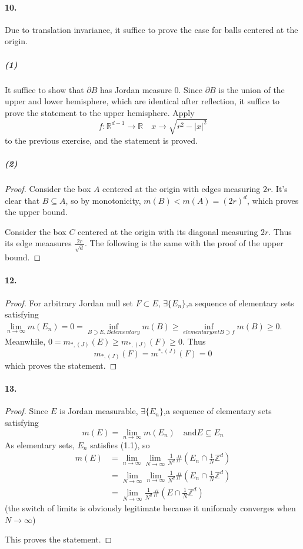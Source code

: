 \documentclass{article}
\begin{document}
\paragraph{10.}
Due to translation invariance, it suffice to prove the case for balls centered at the origin.
\subparagraph{(1)}
It suffice to show that $\partial B$ has Jordan measure 0. Since $\partial B$ is the union of the upper and lower hemisphere, which are identical after reflection, it suffice to prove the statement to the upper hemisphere. Apply \[f:\mathbb{R}^{d-1}\to \mathbb{R}\quad x\to \sqrt{r^2-|x|^2}\]
to the previous exercise, and the statement is proved.
\subparagraph{(2)}
\begin{proof}
Consider the box $A$ centered at the origin with edges measuring $2r$. It's clear that $B\subseteq A$, so by monotonicity, $m(B)<m(A)=(2r)^d$, which proves the upper bound.

Consider the box $C$ centered at the origin with its diagonal measuring $2r$. Thus its edge meaasures $\frac{2r}{\sqrt{d}}$. The following is the same with the proof of the upper bound.
\end{proof}

\paragraph{12.}
\begin{proof}
For arbitrary Jordan null set $F \subset E$, $\exists \{E_n\}$,a sequence of elementary sets satisfying $\lim\limits_{n\to \infty}m(E_n)=0=\inf\limits_{B\supset E, B elementary} m(B)\geq\inf\limits_{elementary set B\supset f} m(B)\geq 0$. Meanwhile, $0=m_{*,(J)}(E) \geq m_{*,(J)}(F)\geq 0$. Thus
\[ m_{*,(J)}(F)=m^{*,(J)}(F)=0\]
which proves the statement.
\end{proof}


\paragraph{13.}
\begin{proof}
Since $E$ is Jordan measurable, $\exists \{E_n\}$,a sequence of elementary sets satisfying
\[m(E)=\lim_{n\to\infty}m(E_n) \quad \text{and} E\subseteq E_n\]
As elementary sets, $E_n$ satisfies (1.1), so
\begin{align*}
m(E)&=\lim_{n\to\infty}\lim_{N\to\infty}\frac{1}{N^d}\# (E_n\cap \frac{1}{N}\mathbb{Z}^d)\\
&=\lim_{N\to\infty}\lim_{n\to\infty}\frac{1}{N^d}\# (E_n\cap \frac{1}{N}\mathbb{Z}^d)\\
&=\lim_{N\to\infty}\frac{1}{N^d}\# (E\cap \frac{1}{N}\mathbb{Z}^d)
\end{align*}
(the switch of limits is obviously legitimate because it unifomaly  converges when $N\to \infty$)

This proves the statement.
\end{proof}
\end{document}
